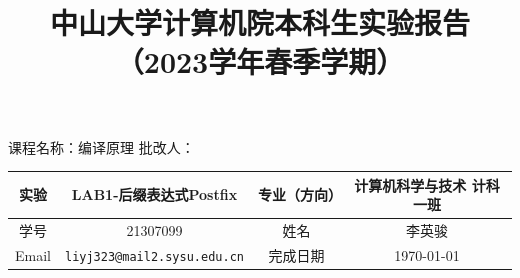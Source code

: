 \documentclass{article}
\title{中山大学计算机院本科生实验报告\\
    （2023学年春季学期）
}
\begin{document}
\maketitle
课程名称：编译原理 \qquad\qquad\qquad\qquad\qquad\qquad
批改人：
\begin{table}[h]
    \centering
    \begin{tabular}{|c|c|c|c|} \hline
        实验    & LAB1-后缀表达式Postfix                   & 专业（方向） & 计算机科学与技术 计科一班 \\ \hline
        学号    & 21307099                           & 姓名     & 李英骏           \\\hline
        Email & \texttt{liyj323@mail2.sysu.edu.cn} & 完成日期   & \today        \\\hline
    \end{tabular}
\end{table}
\tableofcontents

\newpage
\end{document}
